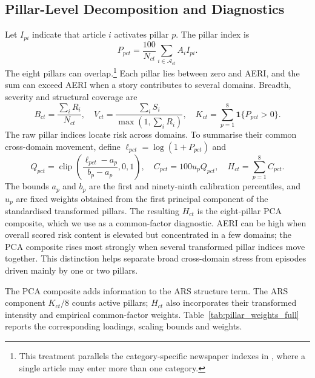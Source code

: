 \documentclass[12pt]{article}
\newcommand{\clip}{\operatorname{clip}}
\newcommand{\ind}{\mathbf{1}}
\begin{document}
\subsection{Pillar-Level Decomposition and Diagnostics}\label{sec:pillars_diagnostics}
Let $I_{pi}$ indicate that article $i$ activates pillar $p$. The pillar index is
\begin{equation}P_{pct}=\frac{100}{N_{ct}}\sum_{i\in\mathcal A_{ct}}A_iI_{pi}.\label{eq:pillar}\end{equation}
The eight pillars can overlap.\footnote{This treatment parallels the category-specific newspaper indexes in \citet{baker2016}, where a single article may enter more than one category.} Each pillar lies between zero and AERI, and the sum can exceed AERI when a story contributes to several domains. Breadth, severity and structural coverage are
\begin{equation}B_{ct}=\frac{\sum_iR_i}{N_{ct}},\quad V_{ct}=\frac{\sum_iS_i}{\max(1,\sum_iR_i)},\quad K_{ct}=\sum_{p=1}^{8}\ind\{P_{pct}>0\}.\label{eq:diagnostics}\end{equation}
The raw pillar indices locate risk across domains. To summarise their common cross-domain movement, define $\ell_{pct}=\log(1+P_{pct})$ and
\begin{equation}Q_{pct}=\clip\left(\frac{\ell_{pct}-a_p}{b_p-a_p},0,1\right),\quad C_{pct}=100u_pQ_{pct},\quad H_{ct}=\sum_{p=1}^{8}C_{pct}.\label{eq:pca_pillars}\end{equation}
The bounds $a_p$ and $b_p$ are the first and ninety-ninth calibration percentiles, and $u_p$ are fixed weights obtained from the first principal component of the standardised transformed pillars. The resulting $H_{ct}$ is the eight-pillar PCA composite, which we use as a common-factor diagnostic. AERI can be high when overall scored risk content is elevated but concentrated in a few domains; the PCA composite rises most strongly when several transformed pillar indices move together. This distinction helps separate broad cross-domain stress from episodes driven mainly by one or two pillars.

The PCA composite adds information to the ARS structure term. The ARS component $K_{ct}/8$ counts active pillars; $H_{ct}$ also incorporates their transformed intensity and empirical common-factor weights. Table~\ref{tab:pillar_weights_full} reports the corresponding loadings, scaling bounds and weights.
\end{document}
